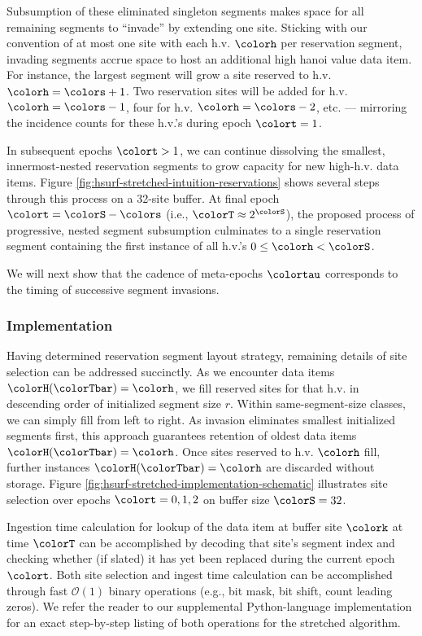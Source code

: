 Subsumption of these eliminated singleton segments makes space for all remaining segments to ``invade'' by extending one site.
Sticking with our convention of at most one site with each h.v. $\colorh$ per reservation segment, invading segments accrue space to host an additional high hanoi value data item.
For instance, the largest segment will grow a site reserved to h.v. $\colorh=\colors +1$.
Two reservation sites will be added for h.v. $\colorh=\colors - 1$, four for h.v. $\colorh=\colors - 2$, etc. --- mirroring the incidence counts for these h.v.'s during epoch $\colort=1$.

In subsequent epochs $\colort>1$, we can continue dissolving the smallest, innermost-nested reservation segments to grow capacity for new high-h.v. data items.
Figure \ref{fig:hsurf-stretched-intuition-reservations} shows several steps through this process on a 32-site buffer.
At final epoch $\colort=\colorS-\colors$ (i.e., $\colorT \approx 2^{\colorS}$), the proposed process of progressive, nested segment subsumption culminates to a single reservation segment containing the first instance of all h.v.'s $0 \leq \colorh < \colorS$.

We will next show that the cadence of meta-epochs $\colortau$ corresponds to the timing of successive segment invasions.



\subsubsection{Implementation}

Having determined reservation segment layout strategy, remaining details of site selection can be addressed succinctly.
As we encounter data items $\colorH(\colorTbar) = \colorh$, we fill reserved sites for that h.v. in descending order of initialized segment size $r$.
Within same-segment-size classes, we can simply fill from left to right.
As invasion eliminates smallest initialized segments first, this approach guarantees retention of oldest data items $\colorH(\colorTbar) = \colorh$.
Once sites reserved to h.v. $\colorh$ fill, further instances $\colorH(\colorTbar) = \colorh$ are discarded without storage.
Figure \ref{fig:hsurf-stretched-implementation-schematic} illustrates site selection over epochs $\colort=0,1,2$ on buffer size $\colorS=32$.

Ingestion time calculation for lookup of the data item at buffer site $\colork$ at time $\colorT$ can be accomplished by decoding that site's segment index and checking whether (if slated) it has yet been replaced during the current epoch $\colort$.
Both site selection and ingest time calculation can be accomplished through fast $\mathcal{O}(1)$ binary operations (e.g., bit mask, bit shift, count leading zeros).
We refer the reader to our supplemental Python-language implementation for an exact step-by-step listing of both operations for the stretched algorithm.

